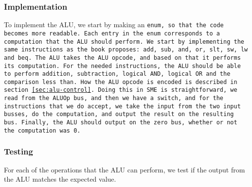 \subsubsection*{Implementation}
To implement the ALU, we start by making an \tt{enum}, so that the code becomes
more readable. Each entry in the \tt{enum} corresponds to a computation that
the ALU should perform. We start by implementing the same instructions as the
book proposes:  %
\texttt{add}, \texttt{sub}, \texttt{and}, \texttt{or}, \texttt{slt},
\texttt{sw}, \texttt{lw} and \texttt{beq}. The ALU takes the ALU opcode, and
based on that it performs its computation. For the needed instructions, the ALU
should be able to perform addition, subtraction, logical \tt{AND}, logical
\tt{OR} and the comparison less than. How the ALU opcode is encoded is
described in section \ref{sec:alu-control}.  Doing this in SME is
straightforward, we read from the ALUOp bus, and then we have a
\texttt{switch}, and for the instructions that we do accept, we take the input
from the two input busses, do the computation, and output the result on the
resulting bus. Finally, the ALU should output on the zero bus, whether or not
the computation was 0.

\subsubsection*{Testing}
For each of the operations that the ALU can perform, we test if the output from
the ALU matches the expected value.

